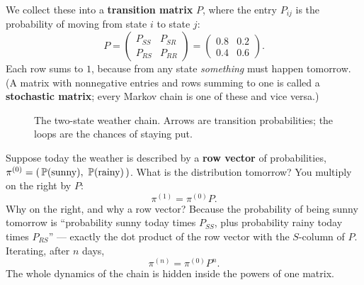We collect these into a \textbf{transition matrix} $P$, where the entry
$P_{ij}$ is the probability of moving from state $i$ to state $j$:
\[
  P = \begin{pmatrix} P_{SS} & P_{SR} \\ P_{RS} & P_{RR} \end{pmatrix}
    = \begin{pmatrix} 0.8 & 0.2 \\ 0.4 & 0.6 \end{pmatrix}.
\]
Each row sums to $1$, because from any state \emph{something} must happen
tomorrow. (A matrix with nonnegative entries and rows summing to one is called a
\textbf{stochastic matrix}; every Markov chain is one of these and vice versa.)

\begin{figure}[H]
  \centering
  \caption{The two-state weather chain. Arrows are transition probabilities;
  the loops are the chances of staying put.}
  \label{ch24:fig-weather-diagram}
\end{figure}

Suppose today the weather is described by a \textbf{row vector} of probabilities,
$\pi^{(0)} = (\,\P(\text{sunny}),\ \P(\text{rainy})\,)$. What is the distribution
tomorrow? You multiply on the right by $P$:
\[
  \pi^{(1)} = \pi^{(0)} P.
\]
Why on the right, and why a row vector? Because the probability of being sunny
tomorrow is ``probability sunny today times $P_{SS}$, plus probability rainy
today times $P_{RS}$'' --- exactly the dot product of the row vector with the
$S$-column of $P$. Iterating, after $n$ days,
\[
  \pi^{(n)} = \pi^{(0)} P^n.
\]
The whole dynamics of the chain is hidden inside the powers of one matrix.

